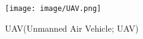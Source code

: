 
\begin{figure}[htbp]
\centering%
\texttt{[image: image/UAV.png]}
\caption{UAV(Unmanned Air Vehicle; UAV)\cite{houritsu} } %
\label{UAV} %
\end{figure}
\newpage
